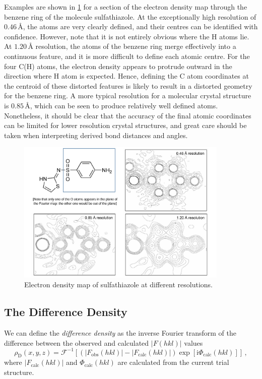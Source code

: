 \documentclass{article}
\theoremstyle{plain}\theoremheaderfont{\normalfont\itshape}\theorembodyfont{\rmfamily}\theoremseparator{.}\newtheorem*{rem}{Remark}\newtheorem*{ex}{Example}\newtheorem*{proof}{Proof}\newtheorem*{altp}{Alternative proof}
\theoremstyle{plain}\theoremheaderfont{\normalfont\bfseries}\theorembodyfont{\rmfamily}\theoremseparator{.}\newtheorem{thm}{Theorem}[section]\newtheorem{lem}[thm]{Lemma}\newtheorem{prop}[thm]{Proposition}\newtheorem*{cor}{Corollary}\newtheorem{defn}[thm]{Definition}\newtheorem{clm}[thm]{Claim}\newtheorem{clminproof}{Claim}\newtheorem*{law}{Law}\newtheorem{pos}[thm]{Postulate}
\theoremstyle{break}\theoremheaderfont{\normalfont\itshape}\theorembodyfont{\rmfamily}\theoremseparator{.\medskip}\newtheorem*{proofskip}{Proof}\newtheorem*{exs}{Examples}\newtheorem*{rems}{Remarks}
\theoremstyle{break}\theoremheaderfont{\normalfont\bfseries}\theorembodyfont{\rmfamily}\theoremseparator{.\medskip}\newtheorem{lemskip}[thm]{Lemma}\newtheorem{defnskip}[thm]{Definition}\newtheorem{propskip}[thm]{Proposition}\newtheorem{thmskip}[thm]{Theorem}
\numberwithin{equation}{section}
\newcommand{\ii}{\mathrm{i}}
\newcommand{\abs}[1]{\left| #1 \right|}
\begin{document}
    Examples are shown in \cref{Fig:Resolution} for a section of the electron density map through the benzene ring of the molecule sulfathiazole. At the exceptionally high resolution of \(0.46\,\text{\AA}\), the atoms are very clearly defined, and their centres can be identified with confidence. However, note that it is not entirely obvious where the H atoms lie. At \(1.20\,\text{\AA}\) resolution, the atoms of the benzene ring merge effectively into a continuous feature, and it is more difficult to define each atomic centre. For the four C(H) atoms, the electron density appears to protrude outward in the direction where H atom is expected. Hence, defining the C atom coordinates at the centroid of these distorted features is likely to result in a distorted geometry for the benzene ring. A more typical resolution for a molecular crystal structure is \(0.85\,\text{\AA}\), which can be seen to produce relatively well defined atoms. Nonetheless, it should be clear that the accuracy of the final atomic coordinates can be limited for lower resolution crystal structures, and great care should be taken when interpreting derived bond distances and angles.

    \begin{figure}
        \centering
        \includegraphics[width=0.9\textwidth]{Resolution.png}
        \caption{Electron density map of sulfathiazole at different resolutions.}
        \label{Fig:Resolution}
    \end{figure}

    \subsection{The Difference Density}
    We can define the \textit{difference density} as the inverse Fourier transform of the difference between the observed and calculated \(\abs{F(hkl)}\) values
    \begin{equation}
        \rho_{\text{D}}(x,y,z)=\mathcal{F}^{-1}\left[(\abs{F_{\text{obs}}(hkl)}-\abs{F_{\text{calc}}(hkl)})\exp[\ii\Phi_{\text{calc}}(hkl)]\right]\,,
    \end{equation}
    where \(\abs{F_{\text{calc}}(hkl)}\) and \(\Phi_{\text{calc}}(hkl)\) are calculated from the current trial structure.
\end{document}
